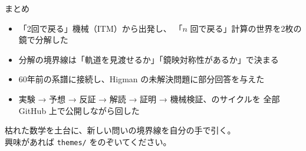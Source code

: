 \documentclass[aspectratio=169,11pt]{beamer}
\begin{document}
\begin{frame}{まとめ}
  \begin{itemize}
    \item 「2回で戻る」機械（ITM）から出発し、
      「\(n\) 回で戻る」計算の世界を2枚の鏡で分解した
    \item 分解の境界線は「軌道を見渡せるか」「鏡映対称性があるか」で決まる
    \item 60年前の系譜に接続し、Higman の未解決問題に部分回答を与えた
    \item 実験 → 予想 → 反証 → 解読 → 証明 → 機械検証、のサイクルを
      全部 GitHub 上で公開しながら回した
  \end{itemize}
  \vspace{1em}
  \begin{center}
    {\large 枯れた数学を土台に、新しい問いの境界線を自分の手で引く。\\
    興味があれば \texttt{themes/} をのぞいてください。}
  \end{center}
\end{frame}
\end{document}
